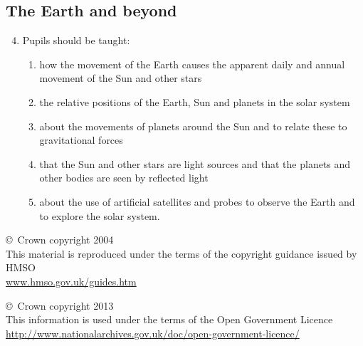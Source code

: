 \documentclass[10pt]{article}
\begin{document}
\begin{paracol}{2}
\switchcolumn

\section{The Earth and beyond}
\begin{enumerate}
\setcounter{enumi}{3}
\item Pupils should be taught:
\begin{enumerate}
\subsection{The solar system}
\item how the movement of the Earth causes the apparent daily and annual
movement of the Sun and other stars
\item the relative positions of the Earth, Sun and planets in the solar system
\item about the movements of planets around the Sun and to relate these 
to gravitational forces
\item that the Sun and other stars are light sources and that the planets and 
other bodies are seen by reflected light
\item about the use of artificial satellites and probes to observe the Earth 
and to explore the solar system.
\end{enumerate}
\end{enumerate}

\end{paracol}

\vfill

\begin{minipage}[t]{0.45\textwidth}
\footnotesize\raggedright
\copyright\ Crown copyright 2004\\
This material is reproduced under the terms of the copyright guidance issued by HMSO\\
\url{www.hmso.gov.uk/guides.htm}\\
\end{minipage}
\hfill
\begin{minipage}[t]{0.45\textwidth}
\footnotesize
\copyright\ Crown copyright 2013\\
This information is used under the terms of the Open Government Licence\\
\url{http://www.nationalarchives.gov.uk/doc/open-government-licence/}\\
\end{minipage}
\end{document}
